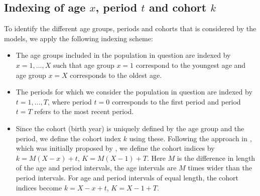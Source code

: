 \subsection{Indexing of age $x$, period $t$ and cohort $k$}
To identify the different age groups, periods and cohorts that is considered by the models, we apply the following indexing scheme:
\begin{itemize}
    \item The age groups included in the population in question are indexed by $x = 1,\ldots,X$ such that age group $x=1$ correspond to the youngest age and age group $x=X$ corresponds to the oldest age.
    \item The periods for which we consider the population in question are indexed by $t=1,\ldots,T$, where period $t=0$ corresponds to the first period and period $t = T$ refers to the most recent period. 
    \item Since the cohort (birth year) is uniquely defined by the age group and the period, we define the cohort index $k$ using these. Following the approach in \cite{rieblerHeld2010}, which was initially proposed by \cite{Heuer1997}, we define the cohort indices by $k = M(X - x) + t$, $K = M(X - 1) + T$. Here $M$ is the difference in length of the age and period intervals, the age intervals are $M$ times wider than the period intervals. For age and period intervals of equal length, the cohort indices become $k = X - x + t$, $K = X - 1 + T.$
\end{itemize}